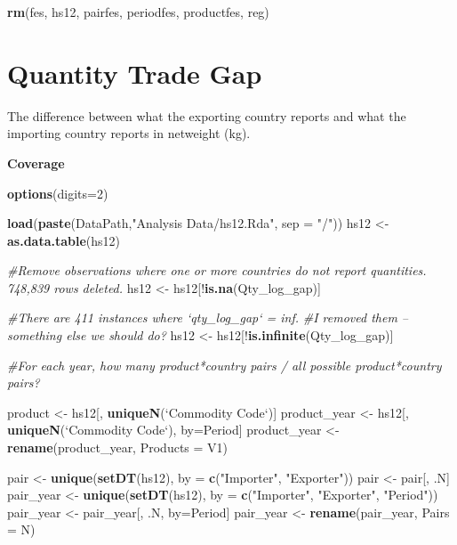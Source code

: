 \documentclass[10pt,]{article}
\newenvironment{Shaded}{\begin{snugshade}}{\end{snugshade}}
\newcommand{\KeywordTok}[1]{\textcolor[rgb]{0.13,0.29,0.53}{\textbf{{#1}}}}
\newcommand{\DataTypeTok}[1]{\textcolor[rgb]{0.13,0.29,0.53}{{#1}}}
\newcommand{\DecValTok}[1]{\textcolor[rgb]{0.00,0.00,0.81}{{#1}}}
\newcommand{\StringTok}[1]{\textcolor[rgb]{0.31,0.60,0.02}{{#1}}}
\newcommand{\CommentTok}[1]{\textcolor[rgb]{0.56,0.35,0.01}{\textit{{#1}}}}
\newcommand{\NormalTok}[1]{{#1}}
\begin{document}
\begin{Shaded}
\begin{Highlighting}[]
\KeywordTok{rm}\NormalTok{(fes, hs12, pairfes, periodfes, productfes, reg)}
\end{Highlighting}
\end{Shaded}

\section{Quantity Trade Gap}\label{quantity-trade-gap}

The difference between what the exporting country reports and what the
importing country reports in netweight (kg).

\textbf{Coverage}

\begin{Shaded}
\begin{Highlighting}[]
\KeywordTok{options}\NormalTok{(}\DataTypeTok{digits=}\DecValTok{2}\NormalTok{)}

\KeywordTok{load}\NormalTok{(}\KeywordTok{paste}\NormalTok{(DataPath,}\StringTok{"Analysis Data/hs12.Rda"}\NormalTok{, }\DataTypeTok{sep =} \StringTok{"/"}\NormalTok{))}
\NormalTok{hs12 <-}\StringTok{ }\KeywordTok{as.data.table}\NormalTok{(hs12)}

\CommentTok{#Remove observations where one or more countries do not report quantities. 748,839 rows deleted. }
\NormalTok{hs12 <-}\StringTok{ }\NormalTok{hs12[!}\KeywordTok{is.na}\NormalTok{(Qty_log_gap)]}

\CommentTok{#There are 411 instances where `qty_log_gap` = inf. }
\CommentTok{#I removed them -- something else we should do?}
\NormalTok{hs12 <-}\StringTok{ }\NormalTok{hs12[!}\KeywordTok{is.infinite}\NormalTok{(Qty_log_gap)]}

\CommentTok{#For each year, how many product*country pairs / all possible product*country pairs?}

\NormalTok{product <-}\StringTok{ }\NormalTok{hs12[, }\KeywordTok{uniqueN}\NormalTok{(}\StringTok{`}\DataTypeTok{Commodity Code}\StringTok{`}\NormalTok{)]}
\NormalTok{product_year <-}\StringTok{ }\NormalTok{hs12[, }\KeywordTok{uniqueN}\NormalTok{(}\StringTok{`}\DataTypeTok{Commodity Code}\StringTok{`}\NormalTok{), by=Period]}
\NormalTok{product_year <-}\StringTok{ }\KeywordTok{rename}\NormalTok{(product_year, }\DataTypeTok{Products =} \NormalTok{V1)}

\NormalTok{pair <-}\StringTok{ }\KeywordTok{unique}\NormalTok{(}\KeywordTok{setDT}\NormalTok{(hs12), }\DataTypeTok{by =} \KeywordTok{c}\NormalTok{(}\StringTok{"Importer"}\NormalTok{, }\StringTok{"Exporter"}\NormalTok{))}
\NormalTok{pair <-}\StringTok{ }\NormalTok{pair[, .N]}
\NormalTok{pair_year <-}\StringTok{ }\KeywordTok{unique}\NormalTok{(}\KeywordTok{setDT}\NormalTok{(hs12), }\DataTypeTok{by =} \KeywordTok{c}\NormalTok{(}\StringTok{"Importer"}\NormalTok{, }\StringTok{"Exporter"}\NormalTok{, }\StringTok{"Period"}\NormalTok{))}
\NormalTok{pair_year <-}\StringTok{ }\NormalTok{pair_year[, .N, by=Period]}
\NormalTok{pair_year <-}\StringTok{ }\KeywordTok{rename}\NormalTok{(pair_year, }\DataTypeTok{Pairs =} \NormalTok{N)}


\end{Highlighting}
\end{Shaded}
\end{document}
